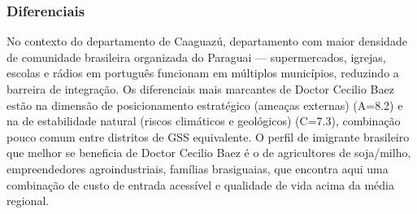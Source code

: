 \subsubsection*{Diferenciais}\label{dif-doctor-cecilio-baez-0504}
No contexto do departamento de Caaguazú, departamento com maior densidade de comunidade brasileira organizada do Paraguai — supermercados, igrejas, escolas e rádios em português funcionam em múltiplos municípios, reduzindo a barreira de integração. Os diferenciais mais marcantes de Doctor Cecilio Baez estão na dimensão de posicionamento estratégico (ameaças externas) (A=8.2) e na de estabilidade natural (riscos climáticos e geológicos) (C=7.3), combinação pouco comum entre distritos de GSS equivalente. O perfil de imigrante brasileiro que melhor se beneficia de Doctor Cecilio Baez é o de agricultores de soja/milho, empreendedores agroindustriais, famílias brasiguaias, que encontra aqui uma combinação de custo de entrada acessível e qualidade de vida acima da média regional.
